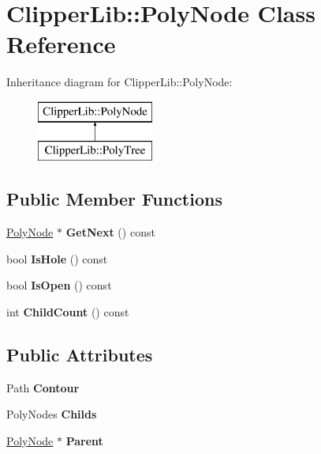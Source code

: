 \hypertarget{class_clipper_lib_1_1_poly_node}{}\section{Clipper\+Lib\+:\+:Poly\+Node Class Reference}
\label{class_clipper_lib_1_1_poly_node}
Inheritance diagram for Clipper\+Lib\+:\+:Poly\+Node\+:\begin{figure}[H]
\begin{center}
\leavevmode
\includegraphics[height=2.000000cm]{class_clipper_lib_1_1_poly_node}
\end{center}
\end{figure}
\subsection*{Public Member Functions}
\begin{DoxyCompactItemize}
\item 
\hypertarget{class_clipper_lib_1_1_poly_node_adbcb861001d8bfbd609c4ba4f4a19a58}{}\label{class_clipper_lib_1_1_poly_node_adbcb861001d8bfbd609c4ba4f4a19a58} 
\hyperlink{class_clipper_lib_1_1_poly_node}{Poly\+Node} $\ast$ {\bfseries Get\+Next} () const
\item 
\hypertarget{class_clipper_lib_1_1_poly_node_a0467801cae1b28ad8a4917b96e551536}{}\label{class_clipper_lib_1_1_poly_node_a0467801cae1b28ad8a4917b96e551536} 
bool {\bfseries Is\+Hole} () const
\item 
\hypertarget{class_clipper_lib_1_1_poly_node_ac9ade640af2515976d337b65e8e84776}{}\label{class_clipper_lib_1_1_poly_node_ac9ade640af2515976d337b65e8e84776} 
bool {\bfseries Is\+Open} () const
\item 
\hypertarget{class_clipper_lib_1_1_poly_node_a19128db6fb2aca66555231edaffa7ade}{}\label{class_clipper_lib_1_1_poly_node_a19128db6fb2aca66555231edaffa7ade} 
int {\bfseries Child\+Count} () const
\end{DoxyCompactItemize}
\subsection*{Public Attributes}
\begin{DoxyCompactItemize}
\item 
\hypertarget{class_clipper_lib_1_1_poly_node_a1d08b8a9499ff8cb89d5d63a12f881ea}{}\label{class_clipper_lib_1_1_poly_node_a1d08b8a9499ff8cb89d5d63a12f881ea} 
Path {\bfseries Contour}
\item 
\hypertarget{class_clipper_lib_1_1_poly_node_a7ac59aea508951a4c979bfca8913261d}{}\label{class_clipper_lib_1_1_poly_node_a7ac59aea508951a4c979bfca8913261d} 
Poly\+Nodes {\bfseries Childs}
\item 
\hypertarget{class_clipper_lib_1_1_poly_node_a9465bc02623316de2af3ab52c6f7041e}{}\label{class_clipper_lib_1_1_poly_node_a9465bc02623316de2af3ab52c6f7041e} 
\hyperlink{class_clipper_lib_1_1_poly_node}{Poly\+Node} $\ast$ {\bfseries Parent}
\end{DoxyCompactItemize}
